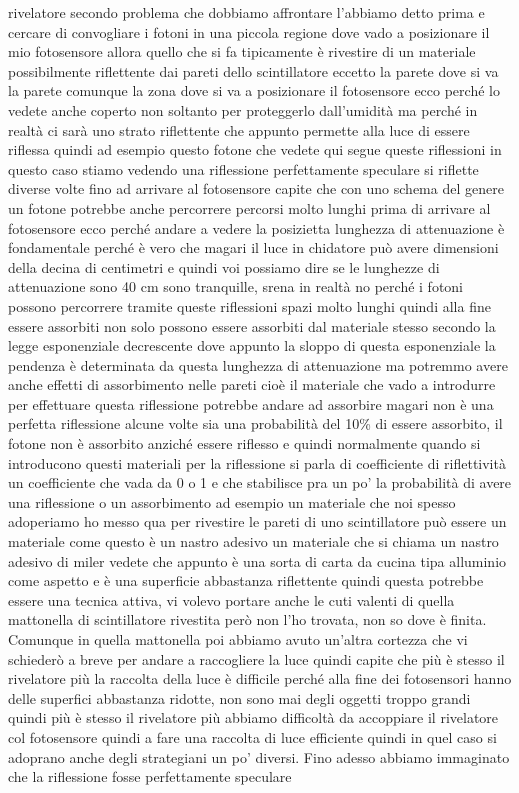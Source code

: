 {rivelatore secondo problema che dobbiamo affrontare l'abbiamo detto prima e cercare di convogliare i fotoni in una piccola regione dove vado a posizionare il mio fotosensore allora quello che si fa tipicamente è rivestire di un materiale possibilmente riflettente dai pareti dello scintillatore eccetto la parete dove si va la parete comunque la zona dove si va a posizionare il fotosensore ecco perché lo vedete anche coperto non soltanto per proteggerlo dall'umidità ma perché in realtà ci sarà uno strato riflettente che appunto permette alla luce di essere riflessa quindi ad esempio questo fotone che vedete qui segue queste riflessioni in questo caso stiamo vedendo una riflessione perfettamente speculare si riflette diverse volte fino ad arrivare al fotosensore capite che con uno schema del genere un fotone potrebbe anche percorrere percorsi molto lunghi prima di arrivare al fotosensore ecco perché andare a vedere la posizietta lunghezza di attenuazione è fondamentale perché è vero che magari il luce in chidatore può avere dimensioni della decina di centimetri e quindi voi possiamo dire se le lunghezze di attenuazione sono 40 cm sono tranquille, srena in realtà no perché i fotoni possono percorrere tramite queste riflessioni spazi molto lunghi quindi alla fine essere assorbiti non solo possono essere assorbiti dal materiale stesso secondo la legge esponenziale decrescente dove appunto la sloppo di questa esponenziale la pendenza è determinata da questa lunghezza di attenuazione ma potremmo avere anche effetti di assorbimento nelle pareti cioè il materiale che vado a introdurre per effettuare questa riflessione potrebbe andare ad assorbire magari non è una perfetta riflessione alcune volte sia una probabilità del 10\% di essere assorbito, il fotone non è assorbito anziché essere riflesso e quindi normalmente quando si introducono questi materiali per la riflessione si parla di coefficiente di riflettività un coefficiente che vada da 0 o 1 e che stabilisce pra un po' la probabilità di avere una riflessione o un assorbimento ad esempio un materiale che noi spesso adoperiamo ho messo qua per rivestire le pareti di uno scintillatore può essere un materiale come questo è un nastro adesivo un materiale che si chiama un nastro adesivo di miler vedete che appunto è una sorta di carta da cucina tipa alluminio come aspetto e è una superficie abbastanza riflettente quindi questa potrebbe essere una tecnica attiva, vi volevo portare anche le cuti valenti di quella mattonella di scintillatore rivestita però non l'ho trovata, non so dove è finita. Comunque in quella mattonella poi abbiamo avuto un'altra cortezza che vi schiederò a breve per andare a raccogliere la luce quindi capite che più è stesso il rivelatore più la raccolta della luce è difficile perché alla fine dei fotosensori hanno delle superfici abbastanza ridotte, non sono mai degli oggetti troppo grandi quindi più è stesso il rivelatore più abbiamo difficoltà da accoppiare il rivelatore col fotosensore quindi a fare una raccolta di luce efficiente quindi in quel caso si adoprano anche degli strategiani un po' diversi. Fino adesso abbiamo immaginato che la riflessione fosse perfettamente speculare

}
